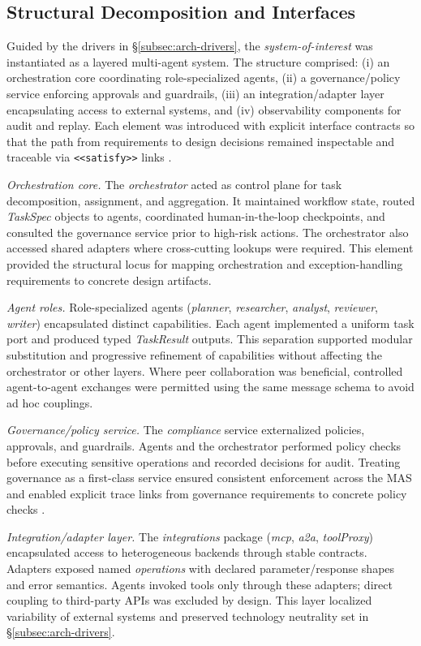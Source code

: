 \subsection{Structural Decomposition and Interfaces}\label{subsec:structural-decomposition}
Guided by the drivers in §\ref{subsec:arch-drivers}, the \emph{system-of-interest} was instantiated as a layered multi-agent system. The structure comprised: (i) an orchestration core coordinating role-specialized agents, (ii) a governance/policy service enforcing approvals and guardrails, (iii) an integration/adapter layer encapsulating access to external systems, and (iv) observability components for audit and replay. Each element was introduced with explicit interface contracts so that the path from requirements to design decisions remained inspectable and traceable via \texttt{<<satisfy>>} links \parencite{IEEEStandard1990}.

\emph{Orchestration core.} The \emph{orchestrator} acted as control plane for task decomposition, assignment, and aggregation. It maintained workflow state, routed \emph{TaskSpec} objects to agents, coordinated human-in-the-loop checkpoints, and consulted the governance service prior to high-risk actions. The orchestrator also accessed shared adapters where cross-cutting lookups were required. This element provided the structural locus for mapping orchestration and exception-handling requirements to concrete design artifacts.

\emph{Agent roles.} Role-specialized agents (\emph{planner}, \emph{researcher}, \emph{analyst}, \emph{reviewer}, \emph{writer}) encapsulated distinct capabilities. Each agent implemented a uniform task port and produced typed \emph{TaskResult} outputs. This separation supported modular substitution and progressive refinement of capabilities without affecting the orchestrator or other layers. Where peer collaboration was beneficial, controlled agent-to-agent exchanges were permitted using the same message schema to avoid ad hoc couplings.

\emph{Governance/policy service.} The \emph{compliance} service externalized policies, approvals, and guardrails. Agents and the orchestrator performed policy checks before executing sensitive operations and recorded decisions for audit. Treating governance as a first-class service ensured consistent enforcement across the MAS and enabled explicit trace links from governance requirements to concrete policy checks \parencite{IEEEStandard1990}.

\emph{Integration/adapter layer.} The \emph{integrations} package (\emph{mcp}, \emph{a2a}, \emph{toolProxy}) encapsulated access to heterogeneous backends through stable contracts. Adapters exposed named \emph{operations} with declared parameter/response shapes and error semantics. Agents invoked tools only through these adapters; direct coupling to third-party APIs was excluded by design. This layer localized variability of external systems and preserved technology neutrality set in §\ref{subsec:arch-drivers}.

